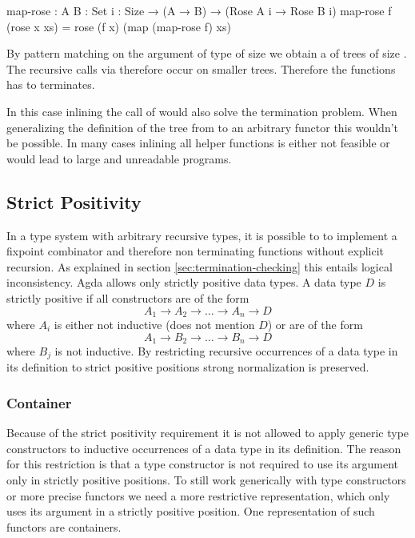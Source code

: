 \documentclass[10pt,a4paper,twoside]{report}
\begin{document}
\begin{code}
map-rose : {A B : Set} {i : Size} → (A → B) → (Rose A i → Rose B i)
map-rose f (rose x xs) = rose (f x) (map (map-rose f) xs)
\end{code}
By pattern matching on the argument of type
\AgdaSpace{} of size
\AgdaSpace{} we obtain a  of
trees of size .
The recursive calls via  therefore occur on smaller trees.
Therefore the functions has to terminates.

In this case inlining the call of  would also solve the
termination problem.
When generalizing the definition of the tree from  to an
arbitrary functor this wouldn't be possible.
In many cases inlining all helper functions is either not feasible or would lead
to large and unreadable programs.


\subsection{Strict Positivity}

In a type system with arbitrary recursive types, it is possible to to implement a
fixpoint combinator and therefore non terminating functions without explicit
recursion.
As explained in section \ref{sec:termination-checking} this entails logical
inconsistency.
Agda allows only strictly positive data types.
A data type $D$ is strictly positive if all constructors are of the form
$$
  A_1 \rightarrow A_2 \rightarrow \dots \rightarrow A_n \rightarrow D
$$
where $A_i$ is either not inductive (does not mention $D$) or are of the form
$$
A_1 \rightarrow B_2 \rightarrow \dots \rightarrow B_n \rightarrow D
$$
where $B_j$ is not inductive.
By restricting recursive occurrences of a data type in its definition to strict
positive positions strong normalization is preserved.

\subsubsection{Container}
\label{container}

Because of the strict positivity requirement it is not allowed to apply generic
type constructors to inductive occurrences of a data type in its definition.
The reason for this restriction is that a type constructor is not required to
use its argument only in strictly positive positions.
To still work generically with type constructors or more precise functors we
need a more restrictive representation, which only uses its argument in a
strictly positive position.
One representation of such functors are containers.
\end{document}
